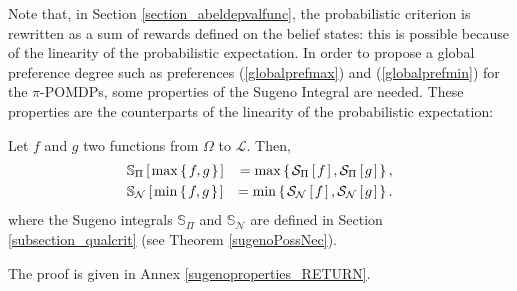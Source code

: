 Note that, in Section \ref{section_abeldepvalfunc},
the probabilistic criterion is rewritten 
as a sum of rewards defined on the belief states:
this is possible because of the linearity of the probabilistic expectation.
In order to propose a global preference degree 
such as preferences (\ref{globalprefmax}) and (\ref{globalprefmin}) 
for the $\pi$-POMDPs,
some properties of the Sugeno Integral are needed.
These properties are the counterparts of the linearity of the probabilistic expectation:
\begin{Property}
\label{sugenoproperties}
Let $f$ and $g$ two functions from $\Omega$ to $\mathcal{L}$. Then,
\begin{eqnarray}
\label{sugenomaxitivity} & \mathbb{S}_{\Pi} \left[ \left.  \max \left\{ \left.  f, g  \right. \right\}   \right. \right] &= \max \left\{ \left.  \mathcal{S}_{\Pi} \left[ \left. f \right. \right] , \mathcal{S}_{\Pi} \left[ \left. g \right. \right]    \right. \right\}, \\
\label{sugenominimitivity} & \mathbb{S}_{\mathcal{N}} \left[ \left.  \min \left\{ \left.  f, g  \right. \right\}   \right. \right] &= \min \left\{ \left.  \mathcal{S}_{\mathcal{N}} \left[ \left. f \right. \right] , \mathcal{S}_{\mathcal{N}} \left[ \left. g \right. \right]    \right. \right\} .
\end{eqnarray}
where the Sugeno integrals $\mathbb{S}_{\Pi}$ and $\mathbb{S}_{\mathcal{N}}$ are defined in Section \ref{subsection_qualcrit} (see Theorem \ref{sugenoPossNec}).
\end{Property}
The proof is given in Annex \ref{sugenoproperties_RETURN}.

